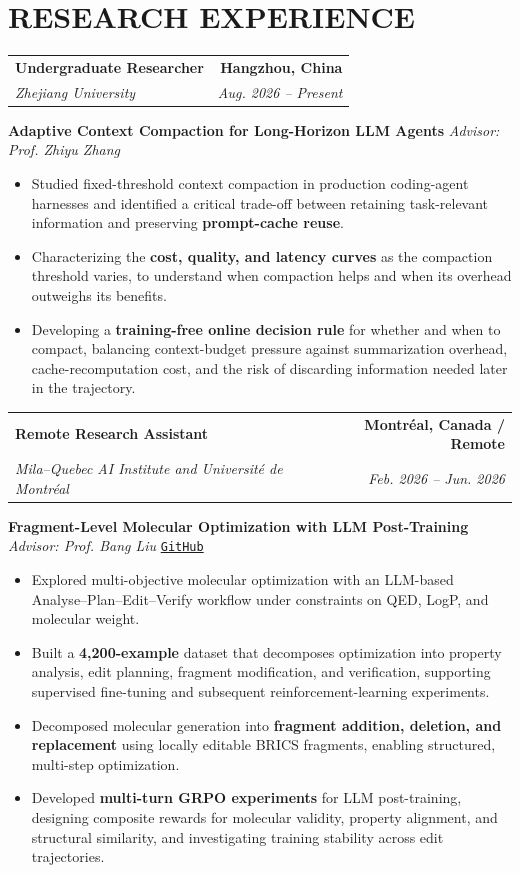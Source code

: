 \documentclass[10pt,letterpaper]{article}
\makeatletter
\newcommand{\entry}[4]{%
  \begin{tabularx}{\textwidth}{@{}Xr@{}}
    \textbf{#1} & \textbf{#2} \\[1pt]
    \textit{#3} & \textit{#4}
  \end{tabularx}\par\nobreak\vspace{4pt}
}
\makeatother
\begin{document}
\section*{RESEARCH EXPERIENCE}
\entry{Undergraduate Researcher}{Hangzhou, China}{Zhejiang University}{Aug. 2026 -- Present}
\textbf{Adaptive Context Compaction for Long-Horizon LLM Agents} \hfill \textit{Advisor: Prof. Zhiyu Zhang}
\begin{itemize}
  \item Studied fixed-threshold context compaction in production coding-agent harnesses and identified a critical trade-off between retaining task-relevant information and preserving \textbf{prompt-cache reuse}.
  \item Characterizing the \textbf{cost, quality, and latency curves} as the compaction threshold varies, to understand when compaction helps and when its overhead outweighs its benefits.
  \item Developing a \textbf{training-free online decision rule} for whether and when to compact, balancing context-budget pressure against summarization overhead, cache-recomputation cost, and the risk of discarding information needed later in the trajectory.
\end{itemize}

\entry{Remote Research Assistant}{Montr\'eal, Canada / Remote}{Mila--Quebec AI Institute and Universit\'e de Montr\'eal}{Feb. 2026 -- Jun. 2026}
\textbf{Fragment-Level Molecular Optimization with LLM Post-Training} \hfill \textit{Advisor: Prof. Bang Liu} \;\textbar\; \href{https://github.com/ZhaoYangPL/Fragment-Level-Molecular-Optimization-with-LLM-Post-Training}{\texttt{GitHub}}
\begin{itemize}
  \item Explored multi-objective molecular optimization with an LLM-based Analyse--Plan--Edit--Verify workflow under constraints on QED, LogP, and molecular weight.
  \item Built a \textbf{4,200-example} dataset that decomposes optimization into property analysis, edit planning, fragment modification, and verification, supporting supervised fine-tuning and subsequent reinforcement-learning experiments.
  \item Decomposed molecular generation into \textbf{fragment addition, deletion, and replacement} using locally editable BRICS fragments, enabling structured, multi-step optimization.
  \item Developed \textbf{multi-turn GRPO experiments} for LLM post-training, designing composite rewards for molecular validity, property alignment, and structural similarity, and investigating training stability across edit trajectories.
\end{itemize}
\end{document}

